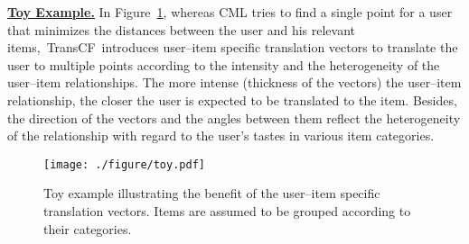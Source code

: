 \documentclass[conference]{IEEEtran}
\newcommand{\propose}{\textsf{{TransCF}}}
\begin{document}
\smallskip
\begin{adjustwidth}{0.1cm}{0.1cm}
	\noindent\textbf{\underline{Toy Example.}}	In Figure~\ref{fig:explanation}, whereas CML tries to find a single point for a user that minimizes the distances between the user and his relevant items,~\propose~introduces user--item specific translation vectors to translate the user to multiple points according to the intensity and the heterogeneity of the user--item relationships. The more intense (thickness of the vectors) the user--item relationship, the closer the user is expected to be translated to the item. 
	Besides, the direction of the vectors and the angles between them reflect the heterogeneity of the relationship with regard to the user's tastes in various item categories.
\end{adjustwidth}
\smallskip


\begin{figure}
	\centering
	\texttt{[image: ./figure/toy.pdf]}
	\caption{
	Toy example illustrating the benefit of the user--item specific translation vectors. Items are assumed to be grouped according to their categories.
}
	\label{fig:explanation}
	\vspace{-2ex}
\end{figure}
\end{document}
